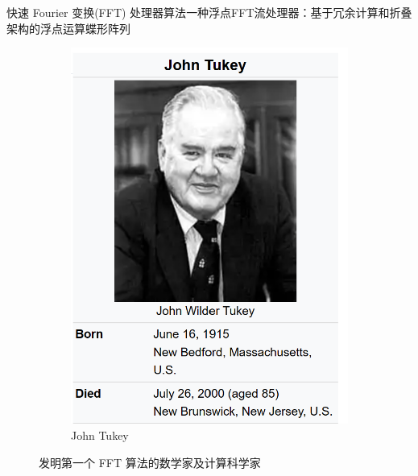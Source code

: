 \documentclass[8pt]{ctexbeamer}
\begin{document}
\begin{frame}{快速 Fourier 变换(FFT) 处理器算法}{一种浮点FFT流处理器：基于冗余计算和折叠架构的浮点运算蝶形阵列}
\begin{figure}[h!]
\begin{subfigure}[b]{0.4\textwidth}
\begin{center}
				\includegraphics[scale=0.2]{figure/JohnTukey.png}
			\end{center}
			\caption{John Tukey}
		\end{subfigure}
		\caption{发明第一个 FFT 算法的数学家及计算科学家}
		\label{fig:Cooley-Tukey}
	\end{figure}


\end{frame}
\end{document}
